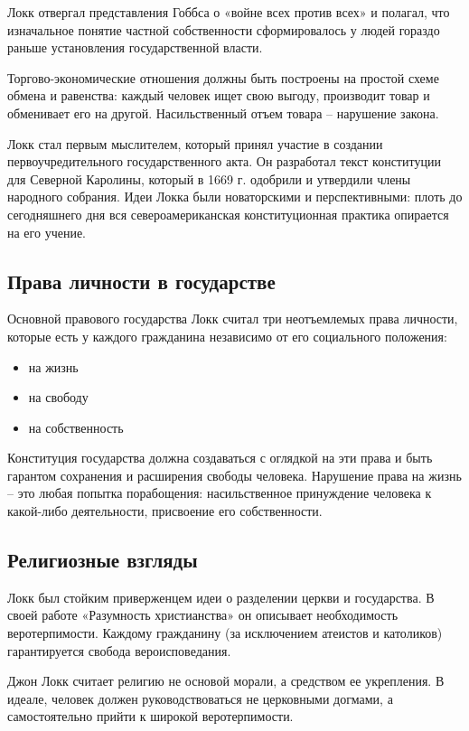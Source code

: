 \documentclass[a4paper, 14pt]{extreport}
\begin{document}
Локк отвергал представления Гоббса о «войне всех против всех» и полагал,
что изначальное понятие частной собственности сформировалось у людей
гораздо раньше установления государственной власти.

Торгово-экономические отношения должны быть построены на простой схеме
обмена и равенства: каждый человек ищет свою выгоду, производит товар и
обменивает его на другой. Насильственный отъем товара -- нарушение
закона.

Локк стал первым мыслителем, который принял участие в создании
первоучредительного государственного акта. Он разработал текст
конституции для Северной Каролины, который в 1669 г. одобрили и
утвердили члены народного собрания. Идеи Локка были новаторскими и
перспективными: плоть до сегодняшнего дня вся североамериканская
конституционная практика опирается на его учение.

\subsection{Права личности в государстве}

Основной правового государства Локк считал три неотъемлемых права
личности, которые есть у каждого гражданина независимо от его
социального положения:

\begin{itemize}

\item
  на жизнь
\item
  на свободу
\item
  на собственность
\end{itemize}

Конституция государства должна создаваться с оглядкой на эти права и
быть гарантом сохранения и расширения свободы человека. Нарушение права
на жизнь -- это любая попытка порабощения: насильственное принуждение
человека к какой-либо деятельности, присвоение его собственности.

\subsection{Религиозные взгляды}

Локк был стойким приверженцем идеи о разделении церкви и государства. В
своей работе «Разумность христианства» он описывает необходимость
веротерпимости. Каждому гражданину (за исключением атеистов и католиков)
гарантируется свобода вероисповедания.

Джон Локк считает религию не основой морали, а средством ее укрепления.
В идеале, человек должен руководствоваться не церковными догмами, а
самостоятельно прийти к широкой веротерпимости.
\end{document}
